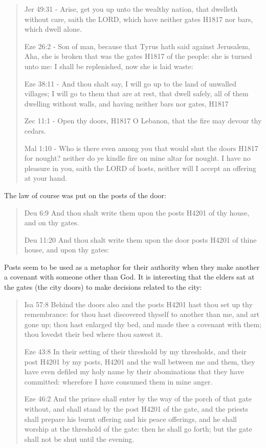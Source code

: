 \documentclass[11pt]{article}
\begin{document}
\begin{quote}
Jer 49:31 - Arise, get you up unto the wealthy nation, that dwelleth without care, saith the LORD, which have neither gates H1817 nor bars, which dwell alone.

Eze 26:2 - Son of man, because that Tyrus hath said against Jerusalem, Aha, she is broken that was the gates H1817 of the people: she is turned unto me: I shall be replenished, now she is laid waste:


Eze 38:11 - And thou shalt say, I will go up to the land of unwalled villages; I will go to them that are at rest, that dwell safely, all of them dwelling without walls, and having neither bars nor gates, H1817

Zec 11:1 - Open thy doors, H1817 O Lebanon, that the fire may devour thy cedars.

Mal 1:10 - Who is there even among you that would shut the doors H1817 for nought? neither do ye kindle fire on mine altar for nought. I have no pleasure in you, saith the LORD of hosts, neither will I accept an offering at your hand.
\end{quote}

The law of course was put on the posts of the door:
\begin{quote}
Deu 6:9
And thou shalt write them upon the posts H4201 of thy house, and on thy gates.

Deu 11:20
And thou shalt write them upon the door posts H4201 of thine house, and upon thy gates:
\end{quote}

Posts seem to be used as a metaphor for their authority when they make another a covenant with someone other than God. It is interesting that the elders sat at the gates (the city doors) to make decisions related to the city:
\begin{quote}
Isa 57:8
Behind the doors also and the posts H4201 hast thou set up thy remembrance: for thou hast discovered thyself to another than me, and art gone up; thou hast enlarged thy bed, and made thee a covenant with them; thou lovedst their bed where thou sawest it.

Eze 43:8
In their setting of their threshold by my thresholds, and their post H4201 by my posts, H4201 and the wall between me and them, they have even defiled my holy name by their abominations that they have committed: wherefore I have consumed them in mine anger.

Eze 46:2
And the prince shall enter by the way of the porch of that gate without, and shall stand by the post H4201 of the gate, and the priests shall prepare his burnt offering and his peace offerings, and he shall worship at the threshold of the gate: then he shall go forth; but the gate shall not be shut until the evening.
\end{quote}
\end{document}
